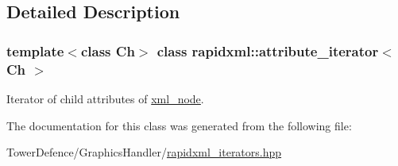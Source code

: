 \subsection{Detailed Description}
\subsubsection*{template$<$class Ch$>$\newline
class rapidxml\+::attribute\+\_\+iterator$<$ Ch $>$}

Iterator of child attributes of \mbox{\hyperlink{classrapidxml_1_1xml__node}{xml\+\_\+node}}. 

The documentation for this class was generated from the following file\+:\begin{DoxyCompactItemize}
\item 
Tower\+Defence/\+Graphics\+Handler/\mbox{\hyperlink{rapidxml__iterators_8hpp}{rapidxml\+\_\+iterators.\+hpp}}\end{DoxyCompactItemize}
